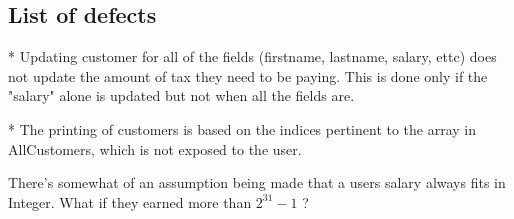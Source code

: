 \subsection{List of defects}



* Updating customer for all of the fields (firstname, lastname, salary, ettc) does not update the amount of tax they need to be paying. This is done only if the "salary" alone is updated but not when all the fields are. 

* The printing of customers is based on the indices pertinent to the array in AllCustomers, which is not exposed to the user. 

There's somewhat of an assumption being made that a users salary always fits in Integer. What if they earned more than $2^31 - 1$ ? 



